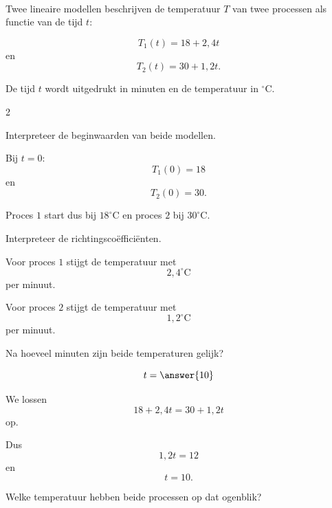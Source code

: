 \documentclass{ximera}
\begin{document}
    \begin{oefening}{\oefG}
    \\
    
    Twee lineaire modellen beschrijven de temperatuur $T$ van twee processen als functie van de tijd $t$:
    
    \[
    T_1(t)=18+2{,}4t
    \]
    en
    \[
    T_2(t)=30+1{,}2t.
    \]
    
    De tijd $t$ wordt uitgedrukt in minuten en de temperatuur in $^\circ\mathrm C$.
    
    \begin{multicols}{2}
    
    \begin{question}
    Interpreteer de beginwaarden van beide modellen.
    
    \begin{oplossing}
    Bij $t=0$:
    \[
    T_1(0)=18
    \]
    en
    \[
    T_2(0)=30.
    \]
    
    Proces $1$ start dus bij $18^\circ\mathrm C$ en proces $2$ bij $30^\circ\mathrm C$.
    \end{oplossing}
    \end{question}
    
    
    \begin{question}
    Interpreteer de richtingscoëfficiënten.
    
    \begin{oplossing}
    Voor proces $1$ stijgt de temperatuur met
    \[
    2{,}4^\circ\mathrm C
    \]
    per minuut.
    
    Voor proces $2$ stijgt de temperatuur met
    \[
    1{,}2^\circ\mathrm C
    \]
    per minuut.
    \end{oplossing}
    \end{question}
    
    
    \begin{question}
    Na hoeveel minuten zijn beide temperaturen gelijk?
    
    \[
    t=\answer{10}
    \]
    
    \begin{oplossing}
    We lossen
    \[
    18+2{,}4t
    =
    30+1{,}2t
    \]
    op.
    
    Dus
    \[
    1{,}2t=12
    \]
    en
    \[
    t=10.
    \]
    \end{oplossing}
    \end{question}
    
    
    \begin{question}
    Welke temperatuur hebben beide processen op dat ogenblik?
    

\end{question}
\end{multicols}
\end{oefening}
\end{document}
